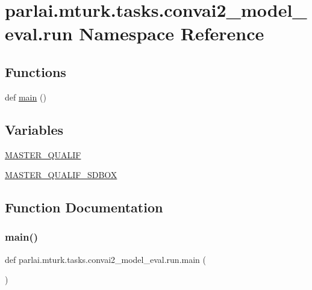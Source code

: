 \hypertarget{namespaceparlai_1_1mturk_1_1tasks_1_1convai2__model__eval_1_1run}{}\section{parlai.\+mturk.\+tasks.\+convai2\+\_\+model\+\_\+eval.\+run Namespace Reference}
\label{namespaceparlai_1_1mturk_1_1tasks_1_1convai2__model__eval_1_1run}
\subsection*{Functions}
\begin{DoxyCompactItemize}
\item 
def \hyperlink{namespaceparlai_1_1mturk_1_1tasks_1_1convai2__model__eval_1_1run_a1624989606bd5fc34368102c32217178}{main} ()
\end{DoxyCompactItemize}
\subsection*{Variables}
\begin{DoxyCompactItemize}
\item 
\hyperlink{namespaceparlai_1_1mturk_1_1tasks_1_1convai2__model__eval_1_1run_a63cb34690751acca7e0414826bc09a0b}{M\+A\+S\+T\+E\+R\+\_\+\+Q\+U\+A\+L\+IF}
\item 
\hyperlink{namespaceparlai_1_1mturk_1_1tasks_1_1convai2__model__eval_1_1run_a84e5489445f1458f929ce705e84edd4f}{M\+A\+S\+T\+E\+R\+\_\+\+Q\+U\+A\+L\+I\+F\+\_\+\+S\+D\+B\+OX}
\end{DoxyCompactItemize}


\subsection{Function Documentation}
\mbox{\label{namespaceparlai_1_1mturk_1_1tasks_1_1convai2__model__eval_1_1run_a1624989606bd5fc34368102c32217178}} 
\subsubsection{\texorpdfstring{main()}{main()}}
{\footnotesize\ttfamily def parlai.\+mturk.\+tasks.\+convai2\+\_\+model\+\_\+eval.\+run.\+main (\begin{DoxyParamCaption}{ }\end{DoxyParamCaption})}

